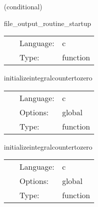    (conditional) 

\hspace{5mm} file\_output\_routine\_startup 

\hspace{5mm}{\it create directory for file output. } 


\hspace{5mm}

 \begin{tabular*}{160mm}{cll} 
~ & Language:  & c \\ 
~ & Type:  & function \\ 
\end{tabular*} 


\vspace{5mm}


\hspace{5mm} initializeintegralcountertozero 

\hspace{5mm}{\it initialize integralcounter variable to zero } 


\hspace{5mm}

 \begin{tabular*}{160mm}{cll} 
~ & Language:  & c \\ 
~ & Options:  & global \\ 
~ & Type:  & function \\ 
\end{tabular*} 


\vspace{5mm}


\hspace{5mm} initializeintegralcountertozero 

\hspace{5mm}{\it initialize integralcounter variable to zero } 


\hspace{5mm}

 \begin{tabular*}{160mm}{cll} 
~ & Language:  & c \\ 
~ & Options:  & global \\ 
~ & Type:  & function \\ 
\end{tabular*} 


\vspace{5mm}

